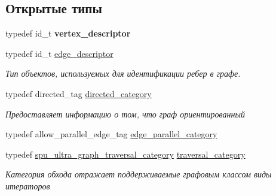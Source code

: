 \subsection*{Открытые типы}
\begin{DoxyCompactItemize}
\item 
\mbox{\label{class_s_p_u___g_r_a_p_h_1_1_spu_ultra_graph_ac639c2679b6d9547625dfe514b2c641d}} 
typedef id\+\_\+t {\bfseries vertex\+\_\+descriptor}
\item 
\mbox{\label{class_s_p_u___g_r_a_p_h_1_1_spu_ultra_graph_a5f3776e003ef0a1648f1d9f84289810b}} 
typedef id\+\_\+t \hyperlink{class_s_p_u___g_r_a_p_h_1_1_spu_ultra_graph_a5f3776e003ef0a1648f1d9f84289810b}{edge\+\_\+descriptor}
\begin{DoxyCompactList}\small\item\em Тип объектов, используемых для идентификации ребер в графе. \end{DoxyCompactList}\item 
\mbox{\label{class_s_p_u___g_r_a_p_h_1_1_spu_ultra_graph_ac9130a0489302bded920012c8810ac4a}} 
typedef directed\+\_\+tag \hyperlink{class_s_p_u___g_r_a_p_h_1_1_spu_ultra_graph_ac9130a0489302bded920012c8810ac4a}{directed\+\_\+category}
\begin{DoxyCompactList}\small\item\em Предоставляет информацию о том, что граф ориентированный \end{DoxyCompactList}\item 
typedef allow\+\_\+parallel\+\_\+edge\+\_\+tag \hyperlink{class_s_p_u___g_r_a_p_h_1_1_spu_ultra_graph_a6ae78f833e62e7fddd57b9c466e75255}{edge\+\_\+parallel\+\_\+category}
\item 
\mbox{\label{class_s_p_u___g_r_a_p_h_1_1_spu_ultra_graph_a489ed5ac88364fdac58607d539de975e}} 
typedef \hyperlink{struct_s_p_u___g_r_a_p_h_1_1_spu_ultra_graph_1_1spu__ultra__graph__traversal__category}{spu\+\_\+ultra\+\_\+graph\+\_\+traversal\+\_\+category} \hyperlink{class_s_p_u___g_r_a_p_h_1_1_spu_ultra_graph_a489ed5ac88364fdac58607d539de975e}{traversal\+\_\+category}
\begin{DoxyCompactList}\small\item\em Категория обхода отражает поддерживаемые графовым классом виды итераторов \end{DoxyCompactList}\item 

\end{DoxyCompactItemize}
